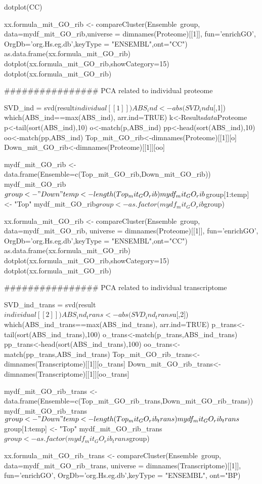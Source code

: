 {dotplot(CC)



xx.formula_mit_GO_rib <- compareCluster(Ensemble~group, data=mydf_mit_GO_rib,universe = dimnames(Proteome)[[1]],
fun='enrichGO', OrgDb='org.Hs.eg.db',keyType = "ENSEMBL",ont="CC")
as.data.frame(xx.formula_mit_GO_rib)
dotplot(xx.formula_mit_GO_rib,showCategory=15)
dotplot(xx.formula_mit_GO_rib)

################ PCA related to individual proteome

SVD_ind = svd(result$individual[[1]])
ABS_ind<-abs(SVD_ind$u[,1])
which(ABS_ind==max(ABS_ind), arr.ind=TRUE)
k<-Results$data$Proteome
p<-tail(sort(ABS_ind),10)
o<-match(p,ABS_ind)
pp<-head(sort(ABS_ind),10)
oo<-match(pp,ABS_ind)
Top_mit_GO_rib<-dimnames(Proteome)[[1]][o]
Down_mit_GO_rib<-dimnames(Proteome)[[1]][oo]

mydf_mit_GO_rib <- data.frame(Ensemble=c(Top_mit_GO_rib,Down_mit_GO_rib))
mydf_mit_GO_rib$group <- "Down"
temp<-length(Top_mit_GO_rib)
mydf_mit_GO_rib$group[1:temp] <- "Top"
mydf_mit_GO_rib$group<-as.factor(mydf_mit_GO_rib$group)

xx.formula_mit_GO_rib <- compareCluster(Ensemble~group, data=mydf_mit_GO_rib, universe = dimnames(Proteome)[[1]],
fun='enrichGO', OrgDb='org.Hs.eg.db',keyType = "ENSEMBL",ont="CC")
as.data.frame(xx.formula_mit_GO_rib)
dotplot(xx.formula_mit_GO_rib,showCategory=15)
dotplot(xx.formula_mit_GO_rib)


################ PCA related to individual transcriptome

SVD_ind_trans = svd(result$individual[[2]])
ABS_ind_trans<-abs(SVD_ind_trans$u[,2])
which(ABS_ind_trans==max(ABS_ind_trans), arr.ind=TRUE)
p_trans<-tail(sort(ABS_ind_trans),100)
o_trans<-match(p_trans,ABS_ind_trans)
pp_trans<-head(sort(ABS_ind_trans),100)
oo_trans<-match(pp_trans,ABS_ind_trans)
Top_mit_GO_rib_trans<-dimnames(Transcriptome)[[1]][o_trans]
Down_mit_GO_rib_trans<-dimnames(Transcriptome)[[1]][oo_trans]

mydf_mit_GO_rib_trans <- data.frame(Ensemble=c(Top_mit_GO_rib_trans,Down_mit_GO_rib_trans))
mydf_mit_GO_rib_trans$group <- "Down"
temp<-length(Top_mit_GO_rib_trans)
mydf_mit_GO_rib_trans$group[1:temp] <- "Top"
mydf_mit_GO_rib_trans$group<-as.factor(mydf_mit_GO_rib_trans$group)

xx.formula_mit_GO_rib_trans <- compareCluster(Ensemble~group, data=mydf_mit_GO_rib_trans, universe = dimnames(Transcriptome)[[1]],
fun='enrichGO', OrgDb='org.Hs.eg.db',keyType = "ENSEMBL", ont="BP)

}
